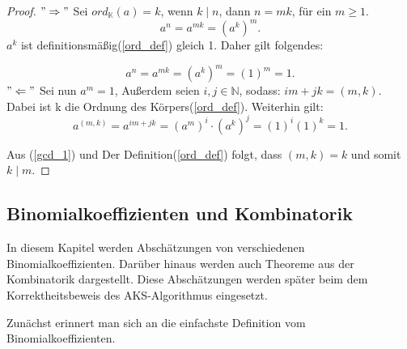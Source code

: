 \documentclass[12pt,oneside]{article}
\theoremstyle{remark}
\theoremstyle{definition}
\begin{document}
\begin{proof}
$"\Rightarrow"$\newline
Sei $ord_{\mathbb{K}}(a) = k $, wenn $k \mid n$, dann $n = mk$, für ein $ m \geq 1$.
\begin{equation}
    a^n = a^{mk} = (a^k)^m. 
\end{equation}
$a^k$ ist definitionsmäßig(\ref{ord_def}) gleich 1. Daher gilt folgendes:

\begin{equation}
    a^n = a^{mk} = (a^k)^m = (1)^m = 1.
\end{equation}
$"\Leftarrow"$\newline
Sei nun $a^m = 1$, Außerdem seien $i,j \in \mathbb{N}$, sodass:\newline
$im + jk = (m,k)$. Dabei ist k die Ordnung des Körpers(\ref{ord_def}).\newline\newline
Weiterhin gilt: 
\begin{equation}\label{gcd_1}
   a^{(m,k)} = a^{im + jk} = (a^m)^i \cdot (a^k)^j = (1)^i (1)^k = 1.
\end{equation}

Aus (\ref{gcd_1}) und Der Definition(\ref{ord_def}) folgt, dass $(m,k) = k$ und somit $k \mid m$.
\end{proof}


\subsection{Binomialkoeffizienten und Kombinatorik}
In diesem Kapitel werden Abschätzungen von verschiedenen Binomialkoeffizienten. Darüber hinaus werden auch Theoreme aus der Kombinatorik dargestellt. Diese Abschätzungen werden später beim dem Korrektheitsbeweis des AKS-Algorithmus eingesetzt.\newline

Zunächst erinnert man sich an die einfachste Definition vom Binomialkoeffizienten.\newline 
\end{document}
